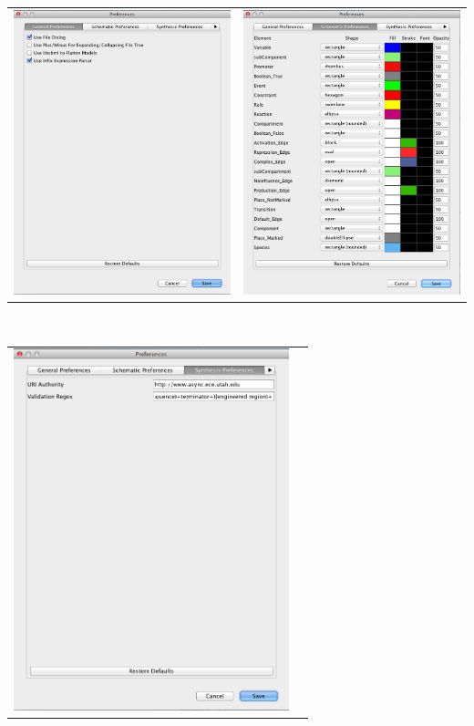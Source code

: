 \documentclass[titlepage,11pt]{article}
\begin{document}
\begin{center}
\begin{tabular}{cc}
\includegraphics[width=80mm]{screenshots/GenPref} &
\includegraphics[width=80mm]{screenshots/SchPref} 
\end{tabular} \\
\begin{tabular}{cc}
\includegraphics[width=80mm]{screenshots/SynPref} &

\end{tabular}
\end{center}
\end{document}

